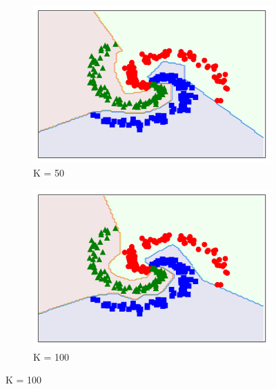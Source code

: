 \documentclass[12pt,letterpaper]{article}
\begin{document}
\begin{figure}
\captionsetup[subfigure]{labelformat=empty}
\centering
\begin{subfigure}{.5\textwidth}
  \centering
  \includegraphics[width=1\linewidth]{EX50.png}
  \caption{K = 50}
  \label{fig:sub1}
\end{subfigure}%
\begin{subfigure}{.5\textwidth}
  \centering
  \includegraphics[width=1\linewidth]{EX100.png}
  \caption{K = 100}
  \label{fig:sub2}
\end{subfigure}
\label{fig:test}
\end{figure}
\end{document}
